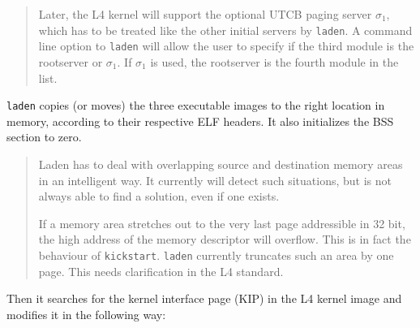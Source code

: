 \documentclass[9pt,a4paper]{extarticle}
\newenvironment{comment}{\footnotesize \begin{quote}}{\end{quote}}
\begin{document}
\begin{comment}
  Later, the L4 kernel will support the optional UTCB paging server
  $\sigma_1$, which has to be treated like the other initial servers
  by \texttt{laden}.  A command line option to \texttt{laden} will
  allow the user to specify if the third module is the rootserver or
  $\sigma_1$.  If $\sigma_1$ is used, the rootserver is the fourth
  module in the list.
\end{comment}

\texttt{laden} copies (or moves) the three executable images to the
right location in memory, according to their respective ELF headers.
It also initializes the BSS section to zero.

\begin{comment}
  Laden has to deal with overlapping source and destination memory
  areas in an intelligent way.  It currently will detect such
  situations, but is not always able to find a solution, even if one
  exists.
  
  If a memory area stretches out to the very last page addressible in
  32 bit, the high address of the memory descriptor will overflow.
  This is in fact the behaviour of \texttt{kickstart}.  \texttt{laden}
  currently truncates such an area by one page.  This needs
  clarification in the L4 standard.
\end{comment}

Then it searches for the kernel interface page (KIP) in the L4 kernel
image and modifies it in the following way:
\end{document}
